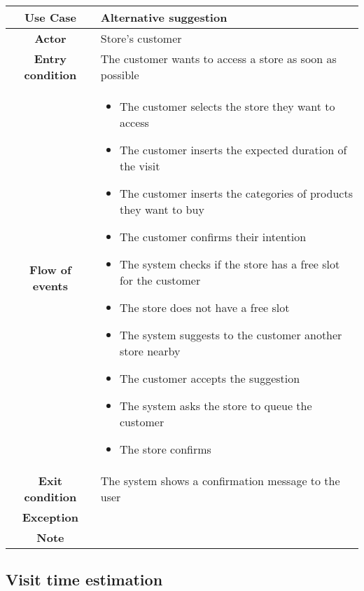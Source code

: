 \documentclass[../../main.tex]{subfiles}
\begin{document}
    \begin{table}[H]
      \centering
        \begin{tabular}{c m{}}
        \hline
        \textbf{Use Case} & Alternative suggestion\\ \hline
        \textbf{Actor} & Store's customer\\ \hline
        \textbf{Entry condition} & The customer wants to access a store as soon as possible\\  \hline
        \textbf{Flow of events} & \begin{itemize}
                                    \item The customer selects the store they want to access
                                    \item The customer inserts the expected duration of the visit
                                    \item The customer inserts the categories of products they want to buy
                                    \item The customer confirms their intention
                                    \item The system checks if the store has a free slot for the customer
                                    \item The store does not have a free slot
                                    \item The system suggests to the customer another store nearby
                                    \item The customer accepts the suggestion
                                    \item The system asks the store to queue the customer
                                    \item The store confirms
                                  \end{itemize}\\ \hline
        \textbf{Exit condition} & The system shows a confirmation message to the user \\ \hline
        \textbf{Exception} & \\ \hline
        \textbf{Note} & \\ \hline
        \end{tabular}
    \end{table}

    \subsection*{Visit time estimation}
\end{document}
